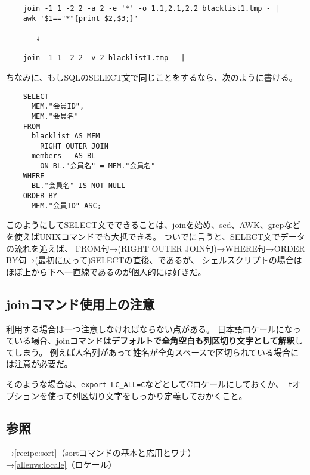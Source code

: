 \begin{verbatim}
	join -1 1 -2 2 -a 2 -e '*' -o 1.1,2.1,2.2 blacklist1.tmp - |
	awk '$1=="*"{print $2,$3;}'

	   ↓

	join -1 1 -2 2 -v 2 blacklist1.tmp - |
\end{verbatim}

ちなみに、もしSQLのSELECT文で同じことをするなら、次のように書ける。

\begin{verbatim}
	SELECT
	  MEM."会員ID",
	  MEM."会員名"
	FROM
	  blacklist AS MEM
	    RIGHT OUTER JOIN
	  members   AS BL
	    ON BL."会員名" = MEM."会員名"
	WHERE
	  BL."会員名" IS NOT NULL
	ORDER BY
	  MEM."会員ID" ASC;
\end{verbatim}

このようにしてSELECT文でできることは、joinを始め、sed、AWK、grepなどを使えばUNIXコマンドでも大抵できる。
ついでに言うと、SELECT文でデータの流れを追えば、
FROM句→(RIGHT OUTER JOIN句)→WHERE句→ORDER BY句→(最初に戻って)SELECTの直後、であるが、
シェルスクリプトの場合はほぼ上から下へ一直線であるのが個人的には好きだ。

\subsection*{joinコマンド使用上の注意}

利用する場合は一つ注意しなければならない点がある。
日本語ロケールになっている場合、joinコマンドは\textbf{デフォルトで全角空白も列区切り文字として解釈}してしまう。
例えば人名列があって姓名が全角スペースで区切られている場合には注意が必要だ。

そのような場合は、\verb|export LC_ALL=C|などとしてCロケールにしておくか、\verb|-t|オプションを使って列区切り文字をしっかり定義しておかくこと。


\subsection*{参照}

\noindent
→\ref{recipe:sort}（sortコマンドの基本と応用とワナ） \\
→\ref{allenvs:locale}（ロケール）
